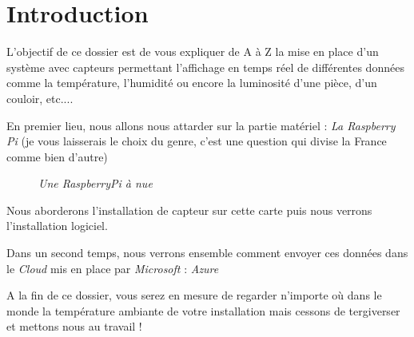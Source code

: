 \chapter*{Introduction}



L'objectif de ce dossier est de vous expliquer de A à Z la mise en place d'un système avec capteurs permettant l'affichage en temps réel de différentes données comme la température, l'humidité ou encore la luminosité d'une pièce, d'un couloir, etc....

En premier lieu, nous allons nous attarder sur la partie matériel : \textit{La Raspberry Pi} (je vous laisserais le choix du genre, c'est une question qui divise la France comme bien d'autre)

\begin{figure}[H]
\begin{center}
\end{center}
	\caption{ \textit{Une RaspberryPi à nue}}
\end{figure}

Nous aborderons l'installation de capteur sur cette carte puis nous verrons l'installation logiciel.

Dans un second temps, nous verrons ensemble comment envoyer ces données dans le \textit{Cloud} mis en place par \textit{Microsoft} : \textit{Azure} 

A la fin de ce dossier, vous serez en mesure de regarder n'importe où dans le monde la température ambiante de votre installation mais cessons de tergiverser et mettons nous au travail !